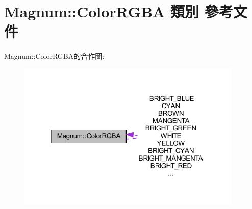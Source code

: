 \hypertarget{class_magnum_1_1_color_r_g_b_a}{}\section{Magnum\+:\+:Color\+R\+G\+BA 類別 參考文件}
\label{class_magnum_1_1_color_r_g_b_a}


Magnum\+:\+:Color\+R\+G\+B\+A的合作圖\+:\nopagebreak
\begin{figure}[H]
\begin{center}
\leavevmode
\includegraphics[width=304pt]{class_magnum_1_1_color_r_g_b_a__coll__graph}
\end{center}
\end{figure}
